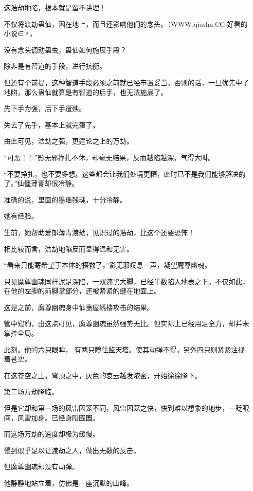 
\begin{this_body}

这浩劫地陷，根本就是蛮不讲理！

不仅将渡劫蛊仙，困在地上，而且还影响他们的念头。（WWW.qiushu.CC 好看的小说∈♀，

没有念头调动蛊虫，蛊仙如何施展手段？

除非是有智道的手段，进行抗衡。

但还有个前提，这种智道手段必须之前就已经布置妥当。否则的话，一旦优先中了地陷，那么蛊仙就算是有智道的后手，也无法施展了。

先下手为强，后下手遭殃。

失去了先手，基本上就完蛋了。

由此可见，浩劫之强，更遑论之上的万劫。

“可恶！！”影无邪挣扎不休，却毫无结果，反而越陷越深，气得大叫。

“不要挣扎，也不要多想。这些都会让我们处境更糟，此时已不是我们能够解决的了。”仙僵薄青却很冷静。

准确的说，里面的墨瑶残魂，十分冷静。

她有经验。

生前，她帮助爱郎薄青渡劫，见识过的浩劫，比这个还要恐怖！

相比较而言，浩劫地陷反而显得温和无害。

“看来只能寄希望于本体的搭救了。”影无邪叹息一声，凝望魔尊幽魂。

只见魔尊幽魂同样泥足深陷，一双漆黑大脚，已经半数陷入地表之下。不仅如此，在他的左脚的前脚掌部分，还被紧紧的缝在地面上。

这是之前，魔尊幽魂身中仙蛊屋绣楼攻击的结果。

管中窥豹，由这点可见，魔尊幽魂虽然强势无比。但实际上已经用足全力，却并未掌控全局。

此刻。他的六只眼眸， 有两只瞪住监天塔。使其动弹不得，另外四只则紧紧注视着苍空。

在这苍空之上，穹顶之中，灰色的哀云越发浓密，开始徐徐降下。

第二场万劫降临。

但是它却和第一场的风雷囚笼不同，风雷囚笼之快，快到难以想象的地步，一眨眼间，风雷加身。已经身陷囹圄。

而这场万劫的速度却极为缓慢。

慢到似乎足以让渡劫之人，做出无数的反击。

但魔尊幽魂却没有动弹。

他静静地站立着，仿佛是一座沉默的山峰。


\end{this_body}
